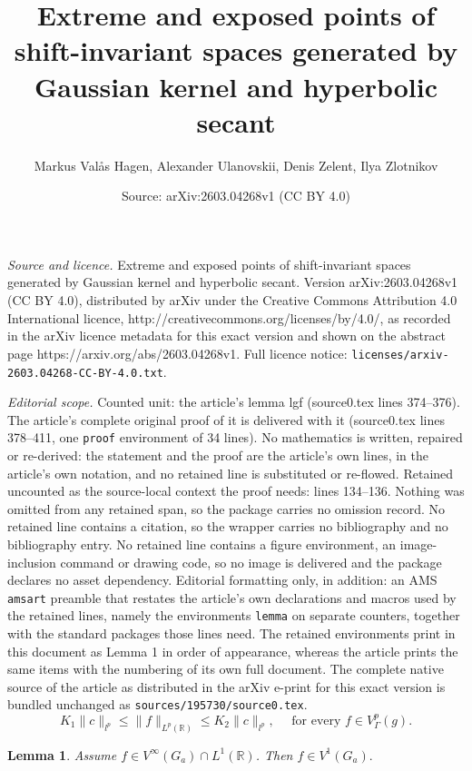 \documentclass[10pt,a4paper]{amsart}
\title{Extreme and exposed points of shift-invariant spaces generated by Gaussian kernel and hyperbolic secant}
\author{Markus Val{\aa}s Hagen, Alexander Ulanovskii, Denis Zelent, Ilya Zlotnikov}
\date{Source: arXiv:2603.04268v1 (CC BY 4.0)}
\newtheorem{lemma}{Lemma}
\newcommand{\R}{{\mathbb R}} \newcommand{\Q}{{\mathbb Q}} \newcommand{\Z}{{\mathbb Z}} \newcommand{\N}{{\mathbb N}}
\begin{document}
\maketitle

\noindent\emph{Source and licence.} Extreme and exposed points of shift-invariant spaces generated by Gaussian kernel and hyperbolic secant. Version arXiv:2603.04268v1 (CC BY 4.0), distributed by arXiv under the Creative Commons Attribution 4.0 International licence, http://creativecommons.org/licenses/by/4.0/, as recorded in the arXiv licence metadata for this exact version and shown on the abstract page https://arxiv.org/abs/2603.04268v1. Full licence notice: \texttt{licenses/arxiv-2603.04268-CC-BY-4.0.txt}.\par\smallskip

\noindent\textit{Editorial scope.} Counted unit: the article's lemma lgf (source0.tex lines 374--376). The article's complete original proof of it is delivered with it (source0.tex lines 378--411, one \texttt{proof} environment of 34 lines). No mathematics is written, repaired or re-derived: the statement and the proof are the article's own lines, in the article's own notation, and no retained line is substituted or re-flowed.  Retained uncounted as the source-local context the proof needs: lines 134--136.  Nothing was omitted from any retained span, so the package carries no omission record.  No retained line contains a citation, so the wrapper carries no bibliography and no bibliography entry.  No retained line contains a figure environment, an image-inclusion command or drawing code, so no image is delivered and the package declares no asset dependency.  Editorial formatting only, in addition: an AMS \texttt{amsart} preamble that restates the article's own declarations and macros used by the retained lines, namely the environments \texttt{lemma} on separate counters, together with the standard packages those lines need.  The retained environments print in this document as Lemma 1 in order of appearance, whereas the article prints the same items with the numbering of its own full document.  The complete native source of the article as distributed in the arXiv e-print for this exact version is bundled unchanged as \texttt{sources/195730/source0.tex}.
\begin{equation}\label{eq:norm_equiv}
    K_1 \|c\|_{l^p} \le \|f\|_{L^p(\R)} \le K_2 \|c\|_{l^p},\quad \text{ for every $f \in V^p_{\Gamma}(g).$}
\end{equation}

\begin{lemma}\label{lgf}
    Assume $f\in V^\infty(G_a)\cap L^1(\R)$. Then $f\in V^1(G_a).$
\end{lemma}
\end{document}
